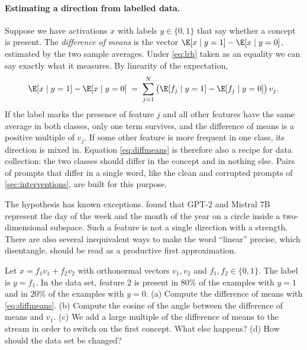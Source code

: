 \paragraph{Estimating a direction from labelled data.} Suppose we have activations $x$ with labels
$y\in\{0,1\}$ that say whether a concept is present. The \emph{difference of means} is the vector
$\E[x\mid y=1]-\E[x\mid y=0]$, estimated by the two sample averages. Under \eqref{eq:lrh} taken as an equality
we can say exactly what it measures. By linearity of the expectation,
\begin{equation}\label{eq:diffmeans}
\E[x\mid y=1]-\E[x\mid y=0] \;=\; \sum_{j=1}^{N}\big(\E[f_j\mid y=1]-\E[f_j\mid y=0]\big)\,v_j .
\end{equation}
If the label marks the presence of feature $j$ and all other features have the same average in both classes,
only one term survives, and the difference of means is a positive multiple of $v_j$. If some other feature is
more frequent in one class, its direction is mixed in. Equation \eqref{eq:diffmeans} is therefore also a recipe
for data collection: the two classes should differ in the concept and in nothing else. Pairs of prompts that
differ in a single word, like the clean and corrupted prompts of \cref{sec:interventions}, are built for this
purpose.

\begin{caution}
The hypothesis has known exceptions. \citet{engels2025not} found that GPT-2 and Mistral 7B represent the day of
the week and the month of the year on a circle inside a two-dimensional subspace. Such a feature is not a single
direction with a strength. There are also several inequivalent ways to make the word ``linear'' precise, which
\citet{park2024linear} disentangle.  should be read as a productive first approximation.
\end{caution}

\begin{exercise}\label{ex:contaminated}
Let $x=f_1v_1+f_2v_2$ with orthonormal vectors $v_1,v_2$ and $f_1,f_2\in\{0,1\}$. The label is $y=f_1$. In the data
set, feature $2$ is present in $80\%$ of the examples with $y=1$ and in $20\%$ of the examples with $y=0$.
(a) Compute the difference of means with \eqref{eq:diffmeans}. (b) Compute the cosine of the angle between the
difference of means and $v_1$. (c) We add a large multiple of the difference of means to the stream in order to
switch on the first concept. What else happens? (d) How should the data set be changed?
\end{exercise}

